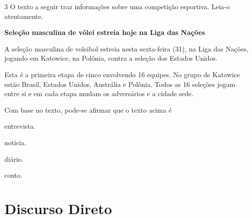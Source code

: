 \begin{conteudo}
\begin{conteudo}
\begin{conteudo}
\begin{conteudo}
\pagebreak
\num{3} O texto a seguir traz informações sobre uma competição esportiva. 
Leia-o atentamente.

\begin{myquote}
\textbf{Seleção masculina de vôlei estreia hoje na Liga das Nações}

A seleção masculina de voleibol estreia nesta sexta-feira
(31), na Liga das Nações, jogando em Katowice, na Polônia, contra a 
seleção dos Estados Unidos.

Esta é a primeira etapa de cinco envolvendo 16 equipes. No grupo de 
Katowice estão Brasil, Estados Unidos, Austrália e Polônia. Todos as 16
seleções jogam entre si e em cada etapa mudam os adversários e a cidade 
sede.

\end{myquote}

Com base no texto, pode-se afirmar que o texto
acima é 

\begin{escolha}
\item entrevista.

\item notícia.

\item diário.

\item conto.
\end{escolha}

\chapter{Discurso Direto}




\end{conteudo}
\end{conteudo}
\end{conteudo}
\end{conteudo}
